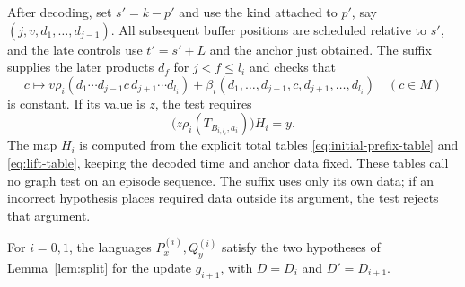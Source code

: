 After decoding, set $s'=k-p'$ and use the kind attached to $p'$,
say $(j,v,d_1,\ldots,d_{j-1})$.  All subsequent buffer positions
are scheduled relative to $s'$, and the late controls use
$t'=s'+L$ and the anchor just obtained.  The suffix supplies the
later products $d_f$ for $j<f\leq l_i$ and checks that
\[
 c\longmapsto
 v\rho_i(d_1\cdots d_{j-1}c\,d_{j+1}\cdots d_{l_i})
 +\beta_i(d_1,\ldots,d_{j-1},c,d_{j+1},\ldots,d_{l_i})
 \quad(c\in M)
\]
is constant.  If its value is $z$, the test requires
\[
 \bigl(z\rho_i(T_{B_{i,l_i},a_i})\bigr)H_i=y.
\]
The map $H_i$ is computed from the explicit total tables
\eqref{eq:initial-prefix-table} and \eqref{eq:lift-table}, keeping
the decoded time and anchor data fixed.  These tables call no graph
test on an episode sequence.  The suffix uses only its own data;
if an incorrect hypothesis places required data outside its argument,
the test rejects that argument.

\begin{proposition}
\label{prop:aligned-splits}
For $i=0,1$, the languages $P_x^{(i)},Q_y^{(i)}$ satisfy the two
hypotheses of Lemma~\ref{lem:split} for the update $g_{i+1}$, with
$D=D_i$ and $D'=D_{i+1}$.
\end{proposition}

